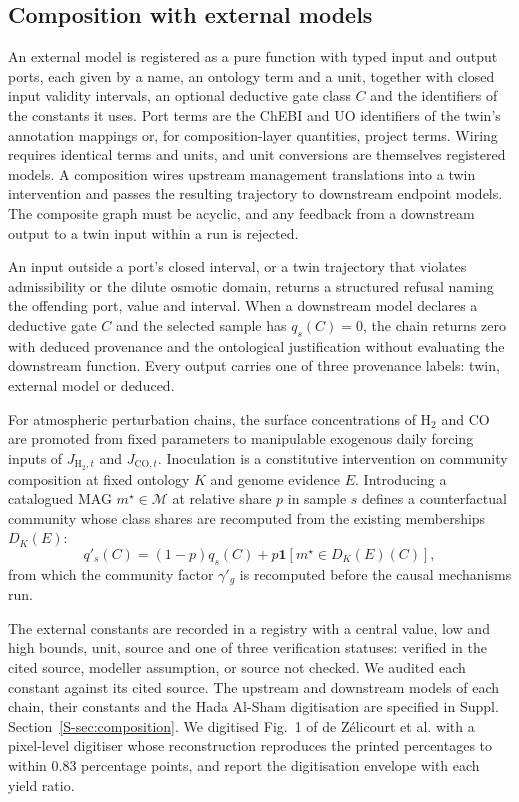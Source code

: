 \documentclass[11pt,a4paper]{article}
\begin{document}
\subsection{Composition with external models}
An external model is registered as a pure function with typed input and output ports, each given by a name, an ontology term and a unit, together with closed input validity intervals, an optional deductive gate class $C$ and the identifiers of the constants it uses. Port terms are the ChEBI and UO identifiers of the twin's annotation mappings or, for composition-layer quantities, project terms. Wiring requires identical terms and units, and unit conversions are themselves registered models. A composition wires upstream management translations into a twin intervention and passes the resulting trajectory to downstream endpoint models. The composite graph must be acyclic, and any feedback from a downstream output to a twin input within a run is rejected.

An input outside a port's closed interval, or a twin trajectory that violates admissibility or the dilute osmotic domain, returns a structured refusal naming the offending port, value and interval. When a downstream model declares a deductive gate $C$ and the selected sample has $q_s(C)=0$, the chain returns zero with deduced provenance and the ontological justification without evaluating the downstream function. Every output carries one of three provenance labels: twin, external model or deduced.

For atmospheric perturbation chains, the surface concentrations of H$_2$ and CO are promoted from fixed parameters to manipulable exogenous daily forcing inputs of $J_{\mathrm{H_2},t}$ and $J_{\mathrm{CO},t}$. Inoculation is a constitutive intervention on community composition at fixed ontology $K$ and genome evidence $E$. Introducing a catalogued MAG $m^\star\in\mathcal{M}$ at relative share $p$ in sample $s$ defines a counterfactual community whose class shares are recomputed from the existing memberships $D_K(E)$:
\begin{equation}
q'_s(C)=(1-p)q_s(C)+p\mathbf{1}[m^\star\in D_K(E)(C)],
\end{equation}
from which the community factor $\gamma'_g$ is recomputed before the causal mechanisms run.

The external constants are recorded in a registry with a central value, low and high bounds, unit, source and one of three verification statuses: verified in the cited source, modeller assumption, or source not checked. We audited each constant against its cited source. The upstream and downstream models of each chain, their constants and the Hada Al-Sham digitisation are specified in Suppl. Section~\ref{S-sec:composition}. We digitised Fig.~1 of de Z\'elicourt et al. \cite{dezelicourt2018sa187} with a pixel-level digitiser whose reconstruction reproduces the printed percentages to within 0.83 percentage points, and report the digitisation envelope with each yield ratio.
\end{document}
